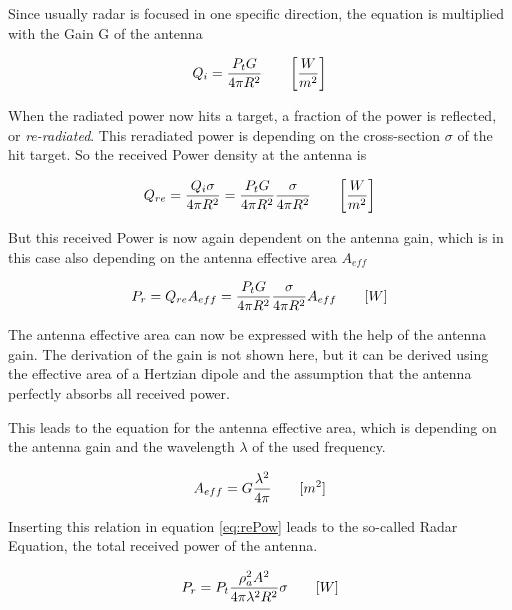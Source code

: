 Since usually radar is focused in one specific direction, the equation is multiplied with the Gain G of the antenna

\begin{equation}
\label{eq:dir}
	\centering
	Q_{i} = \frac{P_t G}{4 \pi R^2} \qquad \bigg[\frac{W}{m^2} \bigg]
\end{equation}

When the radiated power now hits a target, a fraction of the power is reflected, or \textit{re-radiated}. This reradiated power is depending on the cross-section $\sigma$ of the hit target. So the received Power density at the antenna is 

\begin{equation}
\label{eq:rePowDen}
	\centering
	Q_{re} = \frac{Q_i \sigma}{4\pi R^2} = \frac{P_t G}{4 \pi R^2} \frac{\sigma}{4\pi R^2} \qquad \bigg[\frac{W}{m^2} \bigg]
\end{equation}

But this received Power is now again dependent on the antenna gain, which is in this case also depending on the antenna effective area $A_{eff}$

\begin{equation}
\label{eq:rePow}
	\centering
	P_{r} = Q_{re} A_{eff} = \frac{P_t G}{4 \pi R^2} \frac{\sigma}{4\pi R^2} A_{eff}\qquad [W]
\end{equation}

The antenna effective area can now be expressed with the help of the antenna gain. The derivation of the gain is not shown here, but it can be derived using the effective area of a Hertzian dipole and the assumption that the antenna perfectly absorbs all received power.\par
This leads to the equation for the antenna effective area, which is depending on the antenna gain and the wavelength $\lambda $ of the used frequency.

\begin{equation}
\label{eq:Aeff}
	\centering
	A_{eff} = G \frac{\lambda^2}{4\pi} \qquad [m^2]
\end{equation}

Inserting this relation in equation \ref{eq:rePow} leads to the so-called Radar Equation, the total received power of the antenna.

\begin{equation}
\label{eq:radEq}
	\centering
	P_{r} = P_t \frac{\rho_a^2 A^2 }{4 \pi \lambda^2 R^2} \sigma \qquad [W]
\end{equation}

